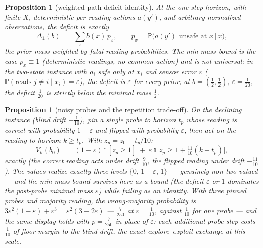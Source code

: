 \documentclass[10pt,twocolumn]{article}
\theoremstyle{plain}
\newtheorem{proposition}[theorem]{Proposition}
\theoremstyle{definition}
\theoremstyle{remark}
\begin{document}
\begin{proposition}[weighted-path deficit identity]\label{prop:pathdeficit}
At the one-step horizon, with finite \(X\), deterministic per-reading
actions \(a(y')\), and arbitrary normalized observations, the deficit
is exactly
\[
\Delta_{1}(b) \;=\; \sum_{x} b(x)\, p_{x},
\qquad p_{x} = \mathbb{P}\bigl(a(y') \text{ unsafe at } x \,\big|\, x\bigr),
\]
the prior mass weighted by fatal-reading probabilities. The min-mass
bound is the case \(p_{x} \equiv 1\) (deterministic readings, no
common action) and is \emph{not universal}: in the two-state instance
with \(a_{i}\) safe only at \(x_{i}\) and sensor error \(\varepsilon\)
(\(\mathbb{P}(\text{reads } j \ne i \mid x_{i}) = \varepsilon\)),
the deficit is \(\varepsilon\) for every prior; at
\(b = (\tfrac12, \tfrac12)\), \(\varepsilon = \tfrac1{20}\), the
deficit \(\tfrac1{20}\) is strictly below the minimal mass
\(\tfrac12\).
\end{proposition}

\begin{proposition}[noisy probes and the repetition trade-off]\label{prop:noisyprobe}
On the declining instance (blind drift \(-\tfrac1{10}\)), pin a single
probe to horizon \(t_{p}\) whose reading is correct with probability
\(1 - \varepsilon\) and flipped with probability \(\varepsilon\),
then act on the reading to horizon \(k \ge t_{p}\). With
\(z_{p} = z_{0} - t_{p}/10\):
\[
V_{k}(b_{0}) \;=\; (1 - \varepsilon)\,\mathbb{1}[z_{p} \ge 1]
\;+\; \varepsilon\,\mathbb{1}\bigl[z_{p} \ge 1 + \tfrac{11}{10}(k - t_{p})\bigr],
\]
exactly (the correct reading acts under drift \(\tfrac9{10}\), the
flipped reading under drift \(-\tfrac{11}{10}\)). The values realize
exactly three levels \(\{0,\, 1 - \varepsilon,\, 1\}\) ---
genuinely non-two-valued --- and the min-mass bound survives here as a
bound (the deficit \(\varepsilon\) or \(1\) dominates the
post-probe minimal mass \(\varepsilon\)) while failing as an
identity. With three pinned probes and majority reading, the
wrong-majority probability is
\(3\varepsilon^{2}(1 - \varepsilon) + \varepsilon^{3} = \varepsilon^{2}(3 - 2\varepsilon)\)
--- \(\tfrac{7}{250}\) at \(\varepsilon = \tfrac1{10}\), against
\(\tfrac1{10}\) for one probe --- and the same display holds with
\(p = \tfrac{7}{250}\) in place of \(\varepsilon\): each
additional probe step costs \(\tfrac1{10}\) of floor margin to the
blind drift, the exact explore--exploit exchange at this scale.
\end{proposition}
\end{document}
